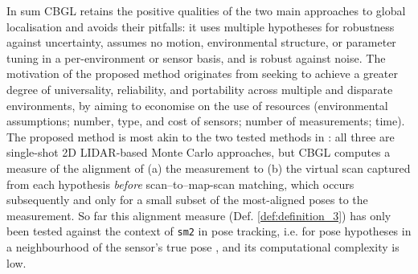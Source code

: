 In sum CBGL retains the positive qualities of the two main approaches to global
localisation and avoids their pitfalls: it uses multiple hypotheses for
robustness against uncertainty, assumes no motion, environmental structure, or
parameter tuning in a per-environment or sensor basis, and is robust against
noise.
The motivation of the proposed method originates from seeking to achieve a
greater degree of universality, reliability, and portability across multiple
and disparate environments, by aiming to economise on the use of resources
(environmental assumptions; number, type, and cost of sensors; number of
measurements; time). The proposed method is most akin to the two tested
methods in \cite{Filotheou2022g}: all three are single-shot 2D LIDAR-based
Monte Carlo approaches, but CBGL computes a measure of the alignment of (a) the
measurement to (b) the virtual scan captured from each hypothesis
\textit{before} scan--to--map-scan matching, which occurs subsequently and only
for a small subset of the most-aligned poses to the measurement. So far this
alignment measure (Def. \ref{def:definition_3}) has only been tested against
the context of \texttt{sm2} in pose tracking, i.e. for pose hypotheses in a
neighbourhood of the sensor's true pose \cite{Filotheou2022f,Filotheou2023a},
and its computational complexity is low.
